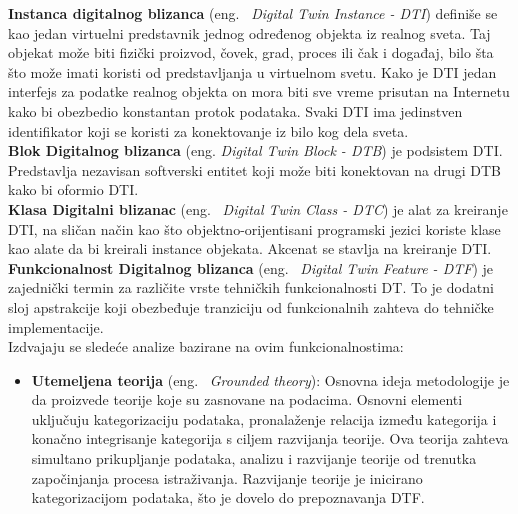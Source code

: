\documentclass[a4paper]{article}
\begin{document}
{\textbf{Instanca digitalnog blizanca} (eng. ~{\em Digital Twin Instance - DTI}) definiše se kao jedan virtuelni predstavnik jednog određenog
objekta iz realnog sveta. Taj objekat može biti fizički proizvod, čovek, grad, proces ili čak i
događaj, bilo šta što može imati koristi od predstavljanja u virtuelnom svetu. Kako je DTI jedan
interfejs za podatke realnog objekta on mora biti sve vreme prisutan na Internetu kako bi
obezbedio konstantan protok podataka. Svaki DTI ima jedinstven identifikator koji se koristi za
konektovanje iz bilo kog dela sveta.\cite{feature}\\
 
\textbf{Blok Digitalnog blizanca} (eng. {\em Digital Twin Block - DTB}) je podsistem DTI. Predstavlja nezavisan softverski entitet koji može
biti konektovan na drugi DTB kako bi oformio DTI.\cite{feature}\\

\textbf{Klasa Digitalni blizanac} (eng. ~{\em Digital Twin Class - DTC}) je alat za kreiranje DTI, na sličan način kao što objektno-orijentisani
programski jezici koriste klase kao alate da bi kreirali instance objekata. Akcenat se stavlja na
kreiranje DTI.\cite{feature}\\

\textbf{Funkcionalnost Digitalnog blizanca} (eng. ~{\em Digital Twin Feature - DTF}) je zajednički termin za različite vrste tehničkih funkcionalnosti
DT. To je dodatni sloj apstrakcije koji obezbeđuje tranziciju od funkcionalnih zahteva do
tehničke implementacije.\cite{feature}\\


Izdvajaju se sledeće analize bazirane na ovim funkcionalnostima:
\begin{itemize}
\item \textbf{Utemeljena teorija} (eng. ~{\em Grounded theory}): Osnovna ideja metodologije je da proizvede teorije koje su zasnovane na
podacima. Osnovni elementi uključuju kategorizaciju podataka, pronalaženje relacija između
kategorija i konačno integrisanje kategorija s ciljem razvijanja teorije. Ova teorija zahteva
simultano prikupljanje podataka, analizu i razvijanje teorije od trenutka započinjanja procesa
istraživanja. Razvijanje teorije je inicirano kategorizacijom podataka, što je dovelo do
prepoznavanja DTF. \cite{feature}


\end{itemize}}
\end{document}
